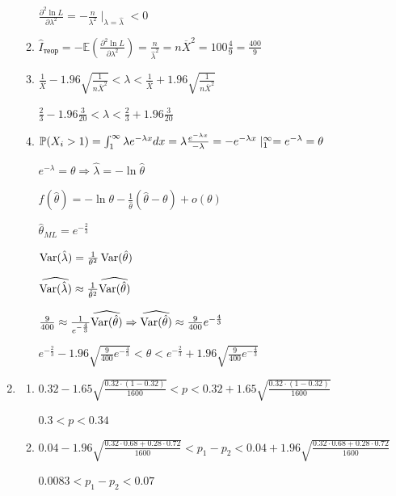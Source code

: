 \documentclass[12pt, a4paper]{article}\usepackage[]{graphicx}\usepackage[]{color}
\begin{document}
\begin{enumerate}
\begin{enumerate}
			$ \frac{\partial^2 \ln L}{\partial \lambda^2} = -\frac{n}{\lambda^2} \mid_{\lambda = \hat{\lambda}} < 0  $
			\item $\hat{I}_{\textbf{теор}} = -\mathbb{E} \left( \frac{\partial^2 \ln L}{\partial \lambda^2}  \right) = \frac{n}{\hat{\lambda}^2} = n \overline{X}^2 = 100 \frac{4}{9} = \frac{400}{9}$
			\item $ \frac{1}{\overline{X}} - 1.96 \sqrt{\frac{1}{n \overline{X}^2}} < \lambda < \frac{1}{\overline{X}} + 1.96 \sqrt{\frac{1}{n \overline{X}^2}} $

			$\frac{2}{3} - 1.96 \frac{3}{20} < \lambda < \frac{2}{3} + 1.96 \frac{3}{20}$
			\item $\P(X_i > 1) = \int_{1}^{\infty} \lambda e^{-\lambda x} dx = \lambda \frac{e^{-\lambda x}}{-\lambda} = -e^{-\lambda x} \mid^\infty_1 = e^{-\lambda} = \theta$

			$e^{-\lambda} = \theta \Rightarrow \hat{\lambda} = -\ln \hat{\theta}$

			$f(\hat{\theta}) = -\ln \theta - \frac{1}{\hat{\theta}} (\hat{\theta} - \theta) + o(\theta)$

			$\hat{\theta}_{ML} = e^{-\frac{2}{3}}$

			$\Var(\hat{\lambda}) = \frac{1}{\theta^2} \Var(\hat{\theta})$

			$\widehat{\Var(\hat{\lambda})} \approx \frac{1}{\hat{\theta}^2} \widehat{\Var(\hat{\theta})}$

			$\frac{9}{400} \approx \frac{1}{e^{-\frac{4}{3}}} \widehat{\Var(\hat{\theta})} \Rightarrow \widehat{\Var(\hat{\theta})} \approx \frac{9}{400} e^{-\frac{4}{3}} $

			$e^{-\frac{2}{3}} - 1.96 \sqrt{\frac{9}{400} e^{-\frac{4}{3}}} < \theta < e^{-\frac{2}{3}} + 1.96 \sqrt{\frac{9}{400} e^{-\frac{4}{3}}} $
		\end{enumerate}

	\item
		\begin{enumerate}
			\item $0.32 - 1.65 \sqrt{\frac{0.32\cdot (1-0.32)}{1600}} < p < 0.32 + 1.65 \sqrt{\frac{0.32\cdot (1-0.32)}{1600}}$

			$0.3 < p < 0.34$

			\item $0.04 -1.96 \sqrt{\frac{0.32\cdot0.68+0.28\cdot0.72}{1600}} < p_1 - p_2 < 0.04 +1.96 \sqrt{\frac{0.32\cdot0.68+0.28\cdot0.72}{1600}} $

			$0.0083 < p_1 - p_2 < 0.07$
		\end{enumerate}


\end{enumerate}
\end{document}
